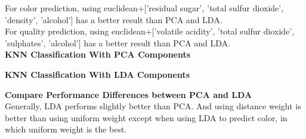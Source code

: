 \documentclass[12pt]{article}
\begin{document}
\noindent
For color prediction, using euclidean+['residual sugar', 'total sulfur dioxide', 'density', 'alcohol'] has a better result than PCA and LDA.\\
For quality prediction, using euclidean+['volatile acidity', 'total sulfur dioxide', 'sulphates', 'alcohol'] has a better result than PCA and LDA.\\
\textbf{KNN Classification With PCA Components}
\begin{figure}[H]
\captionsetup[subfigure]{labelformat=empty}
\centering
{}
\end{figure}
\vspace*{-1.5cm}
\noindent
\textbf{KNN Classification With LDA Components}
\begin{figure}[H]
\captionsetup[subfigure]{labelformat=empty}
\centering
{}
\end{figure}
\noindent
\textbf{Compare Performance Differences between PCA and LDA}\\
Generally, LDA performs slightly better than PCA. And using distance weight is better than using uniform weight except when using LDA to predict color, in which uniform weight is the best.
\end{document}
